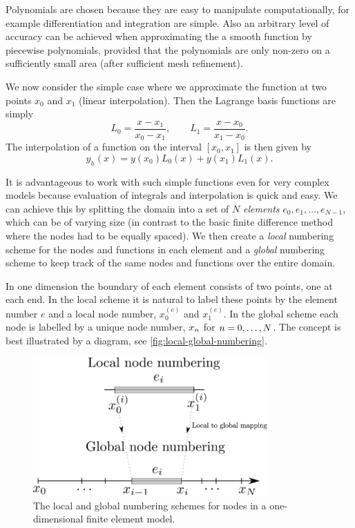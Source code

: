 Polynomials are chosen because they are easy to manipulate computationally, for example differentiation and integration are simple. Also an arbitrary level of accuracy can be achieved when approximating the a smooth function by piecewise polynomials, provided that the polynomials are only non-zero on a sufficiently small area (\ie after sufficient mesh refinement).

We now consider the simple case where we approximate the function at two points
$x_{0}$ and $x_{1}$ (linear interpolation). Then the Lagrange basis
functions are simply
\begin{equation}
  L_{0}=\dfrac{x-x_{1}}{x_{0}-x_{1}},\qquad
  L_{1}=\dfrac{x-x_{0}}{x_{1}-x_{0}}.
  \label{eq:simple_lagrange}
\end{equation}
The interpolation of a function on the interval $[x_{0},x_{1}]$ is then given by
\begin{equation*}
  y_{h}(x)=y(x_{0})L_{0}(x)+y(x_{1})L_{1}(x).
\end{equation*}

It is advantageous to work with such simple functions even for very complex
models because evaluation of integrals and interpolation is quick and easy. We
can achieve this by splitting the domain into a set of $N$ \emph{elements}
$e_{0},e_{1},\ldots,e_{N-1}$, which can be of varying size (in contrast to the
basic finite difference method where the nodes had to be equally spaced). We
then create a \emph{local} numbering scheme for the nodes and functions in each
element and a \emph{global} numbering scheme to keep track of the same nodes and
functions over the entire domain.

In one dimension the boundary of each element consists of two points, one at
each end. In the local scheme it is natural to label these points by the element
number $e$ and a local node number, \ie $x_{0}^{(e)}$ and $x_{1}^{(e)}$. In the
global scheme each node is labelled by a unique node number, \ie $x_{n}$ for $n=0,\ldots,N$.
The concept is best illustrated by a diagram, see \autoref{fig:local-global-numbering}.

\begin{figure}
  \center
  \includegraphics[width=0.8\textwidth]{./images/local_global_numbering}
  \caption{The local and global numbering schemes for nodes in a one-dimensional
    finite element model.}
  \label{fig:local-global-numbering}
\end{figure}


